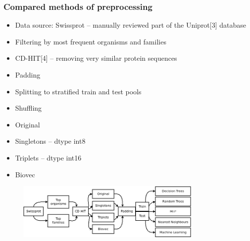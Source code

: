 \documentclass[10pt]{beamer}
\begin{document}
\begin{frame}
\frametitle{Compared methods of preprocessing}
\begin{itemize}
\item Data source: Swissprot -- manually reviewed part of the Uniprot[3] database
\item Filtering by most frequent organisms and families
\item CD-HIT[4] -- removing very similar protein sequences
\item Padding
\item Splitting to stratified train and test pools
\item Shuffling
\end{itemize}

\begin{itemize}
\item Original
\item Singletons -- dtype int8
\item Triplets -- dtype int16
\item Biovec
\end{itemize}
\begin{figure}[H]
\begin{center}
\includegraphics[width=0.8\textwidth]{workflow}
\end{center}
\end{figure}
\end{frame}
\end{document}
